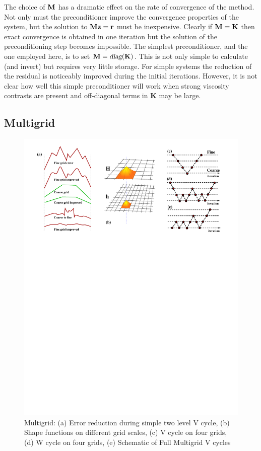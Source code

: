 \documentclass[10pt]{article}
\begin{document}
	The choice of $\bf M$ has a dramatic effect on the rate of convergence of the
	method. Not only must the preconditioner improve the convergence properties of
	the system, but the solution to ${\bf Mz} = \mathbf{r}$ must be inexpensive.
	Clearly if ${\bf M} = \mathbf{K}$ then exact convergence is obtained in one iteration
	but the solution of the preconditioning step becomes impossible. The simplest
	preconditioner, and the one employed here, is to set ${\bf M} = \mbox{\sl diag}(\mathbf{K})$.
	This is not only simple to calculate (and invert) but requires very little storage.
	For simple systems the reduction of the residual is noticeably improved during the initial
	iterations. However, it is not clear how well this simple preconditioner will work
	when strong viscosity contrasts are present and off-diagonal terms in $\mathbf{K}$ may be
	large. 
		
	\subsection{Multigrid}
	
			\begin{figure}[h]           
				\begin{center}
		 			\includegraphics[width=0.66\linewidth]{Diagrams/mg.pdf}
		 			\caption[]{Multigrid: (a) Error reduction during simple two level V cycle,
		 			 (b) Shape functions on different grid scales,
		 			 (c) V cycle on four grids,
		 			 (d) W cycle on four grids,
		 			 (e) Schematic of Full Multigrid V cycles}
		 			\label{fig:mg1}
		 		\end{center}
			\end{figure}	
	
\end{document}
